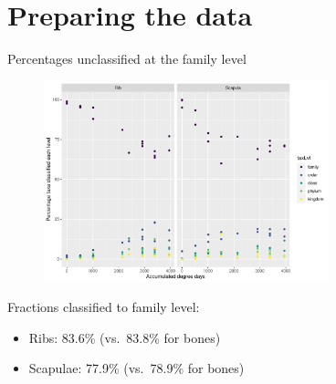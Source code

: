 \documentclass{beamer}
\date{November 2021}
\begin{document}









\section[Preparation]{Preparing the data}



\begin{frame}{Percentages unclassified at the family level}

  \begin{center}
    \begin{figure}
      \includegraphics[width=3.25in]{swabs_family_perc_classif_by_add_type}
    \end{figure}
  \end{center}
  \vspace{-0.1in}
  {\footnotesize
  Fractions classified to family level:
  \begin{itemize}
    \item Ribs: 83.6\% (vs.\ 83.8\% for bones)
    \item Scapulae: 77.9\% (vs.\ 78.9\% for bones)
  \end{itemize}
  }
\end{frame}
\end{document}
